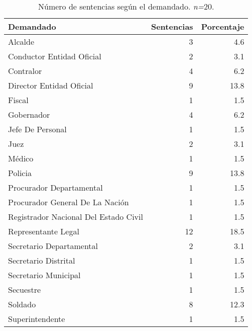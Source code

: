 \begin{table}[!htbp]
\centering
\caption{Número de sentencias según el demandado. \textit{n=}20.} 
\label{tab:demandado}
\begin{tabular}{lrr}
  \hline
Demandado & Sentencias & Porcentaje \\ 
  \hline
Alcalde &  3 & 4.6 \\ 
  Conductor Entidad Oficial &  2 & 3.1 \\ 
  Contralor &  4 & 6.2 \\ 
  Director Entidad Oficial &  9 & 13.8 \\ 
  Fiscal &  1 & 1.5 \\ 
  Gobernador &  4 & 6.2 \\ 
  Jefe De Personal &  1 & 1.5 \\ 
  Juez &  2 & 3.1 \\ 
  Médico &  1 & 1.5 \\ 
  Policia &  9 & 13.8 \\ 
  Procurador Departamental &  1 & 1.5 \\ 
  Procurador General De La Nación &  1 & 1.5 \\ 
  Registrador Nacional Del Estado Civil &  1 & 1.5 \\ 
  Representante Legal & 12 & 18.5 \\ 
  Secretario Departamental &  2 & 3.1 \\ 
  Secretario Distrital &  1 & 1.5 \\ 
  Secretario Municipal &  1 & 1.5 \\ 
  Secuestre &  1 & 1.5 \\ 
  Soldado &  8 & 12.3 \\ 
  Superintendente &  1 & 1.5 \\ 
   \hline
\end{tabular}
\end{table}
